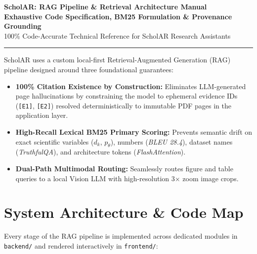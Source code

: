\documentclass[10pt,a4paper]{article}
\begin{document}
\begin{center}
    {\huge \bfseries \color{primary} ScholAR: RAG Pipeline \& Retrieval Architecture Manual} \\[6pt]
    {\large \bfseries \color{secondary} Exhaustive Code Specification, BM25 Formulation \& Provenance Grounding} \\[4pt]
    {\normalsize \color{darktext} 100\% Code-Accurate Technical Reference for ScholAR Research Assistants} \\[4pt]
    \rule{\textwidth}{1pt}
\end{center}

\vspace{-0.5em}

\begin{tcolorbox}[title=Executive Summary \& Architectural Guarantees, colback=lightbg, colframe=primary]
ScholAR uses a custom local-first Retrieval-Augmented Generation (RAG) pipeline designed around three foundational guarantees:
\begin{itemize}[leftmargin=1.5em, itemsep=2pt]
    \item \textbf{100\% Citation Existence by Construction:} Eliminates LLM-generated page hallucinations by constraining the model to ephemeral evidence IDs (\texttt{[E1]}, \texttt{[E2]}) resolved deterministically to immutable PDF pages in the application layer.
    \item \textbf{High-Recall Lexical BM25 Primary Scoring:} Prevents semantic drift on exact scientific variables ($d_k$, $p_\theta$), numbers (\textit{BLEU 28.4}), dataset names (\textit{TruthfulQA}), and architecture tokens (\textit{FlashAttention}).
    \item \textbf{Dual-Path Multimodal Routing:} Seamlessly routes figure and table queries to a local Vision LLM with high-resolution 3$\times$ zoom image crops.
\end{itemize}
\end{tcolorbox}

\section{System Architecture \& Code Map}

Every stage of the RAG pipeline is implemented across dedicated modules in \texttt{backend/} and rendered interactively in \texttt{frontend/}:
\end{document}
